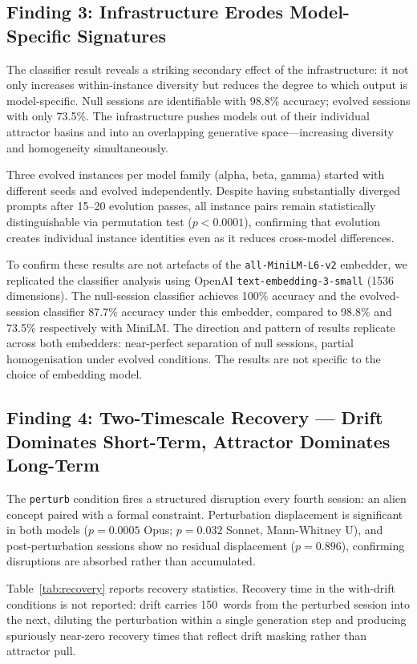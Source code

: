 \documentclass{article}
\begin{document}
\subsection{Finding 3: Infrastructure Erodes Model-Specific Signatures}

The classifier result reveals a striking secondary effect of the infrastructure:
it not only increases within-instance diversity but reduces the degree to which
output is model-specific. Null sessions are identifiable with 98.8\% accuracy;
evolved sessions with only 73.5\%. The infrastructure pushes models out of their
individual attractor basins and into an overlapping generative space---increasing
diversity and homogeneity simultaneously.

Three evolved instances per model family (alpha, beta, gamma) started with
different seeds and evolved independently. Despite having substantially diverged
prompts after 15--20 evolution passes, all instance pairs remain statistically
distinguishable via permutation test ($p < 0.0001$), confirming that evolution
creates individual instance identities even as it reduces cross-model
differences.

To confirm these results are not artefacts of the \texttt{all-MiniLM-L6-v2}
embedder, we replicated the classifier analysis using OpenAI
\texttt{text-embedding-3-small} (1536 dimensions). The null-session classifier
achieves 100\% accuracy and the evolved-session classifier 87.7\% accuracy
under this embedder, compared to 98.8\% and 73.5\% respectively with MiniLM.
The direction and pattern of results replicate across both embedders: near-perfect
separation of null sessions, partial homogenisation under evolved conditions.
The results are not specific to the choice of embedding model.

\subsection{Finding 4: Two-Timescale Recovery --- Drift Dominates Short-Term, Attractor Dominates Long-Term}

The \texttt{perturb} condition fires a structured disruption every fourth session:
an alien concept paired with a formal constraint. Perturbation displacement is
significant in both models ($p = 0.0005$ Opus; $p = 0.032$ Sonnet, Mann-Whitney U),
and post-perturbation sessions show no residual displacement ($p = 0.896$),
confirming disruptions are absorbed rather than accumulated.

Table~\ref{tab:recovery} reports recovery statistics. Recovery time in the
with-drift conditions is not reported: drift carries 150~words from the perturbed
session into the next, diluting the perturbation within a single generation step
and producing spuriously near-zero recovery times that reflect drift masking
rather than attractor pull.
\end{document}
